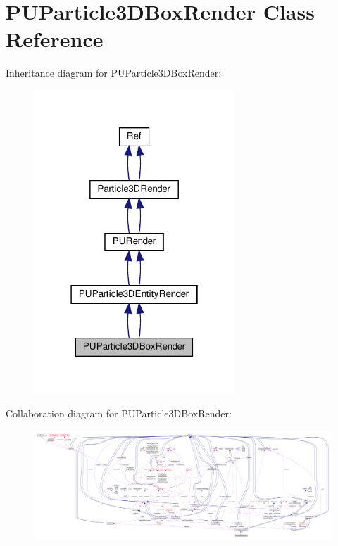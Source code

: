 \hypertarget{classPUParticle3DBoxRender}{}\section{P\+U\+Particle3\+D\+Box\+Render Class Reference}
\label{classPUParticle3DBoxRender}


Inheritance diagram for P\+U\+Particle3\+D\+Box\+Render\+:
\nopagebreak
\begin{figure}[H]
\begin{center}
\leavevmode
\includegraphics[width=214pt]{classPUParticle3DBoxRender__inherit__graph}
\end{center}
\end{figure}


Collaboration diagram for P\+U\+Particle3\+D\+Box\+Render\+:
\nopagebreak
\begin{figure}[H]
\begin{center}
\leavevmode
\includegraphics[width=350pt]{classPUParticle3DBoxRender__coll__graph}
\end{center}
\end{figure}

